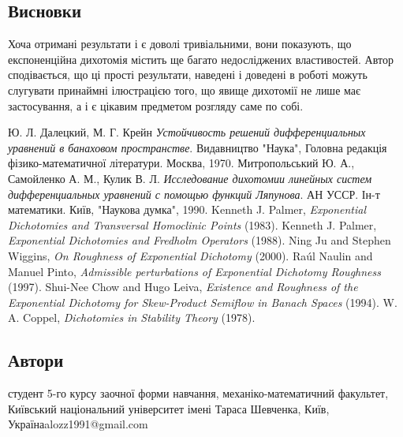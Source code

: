 \documentclass{SHVpaper}
\begin{document}
\subsection{Висновки}
Хоча отримані результати і є доволі тривіальними, вони показують, що експоненційна дихотомія містить ще багато недосліджених 
властивостей. Автор сподівається, що ці прості результати, наведені і доведені в роботі можуть слугувати принаймні ілюстрацією того, що
явище дихотомії не лише має застосування, а і є цікавим предметом розгляду саме по собі.

\begin{thebibliography}{9}
Ю. Л. Далецкий, М. Г. Крейн
\emph{Устойчивость решений дифференциальных уравнений в банаховом пространстве}.
Видавництво "Наука"{}, Головна редакція фізико-математичної літератури. Москва, 1970.
Митропольський Ю. А., Самойленко А. М., Кулик В. Л.
\emph{Исследование дихотомии линейных систем дифференциальных уравнений с помощью функций Ляпунова}.
АН УССР. Ін-т математики. Київ, "Наукова думка", 1990.
	Kenneth J. Palmer, {\em Exponential Dichotomies and Transversal Homoclinic Points} (1983).
	Kenneth J. Palmer, {\em Exponential Dichotomies and Fredholm Operators} (1988).
	Ning Ju and Stephen Wiggins, {\em On Roughness of Exponential Dichotomy} (2000).
	Ra\'ul Naulin and Manuel Pinto, {\em Admissible perturbations of Exponential Dichotomy Roughness} (1997).
	Shui-Nee Chow and Hugo Leiva, {\em Existence and Roughness of the Exponential Dichotomy for Skew-Product Semiflow in Banach Spaces} (1994).
	W. A. Coppel, {\em Dichotomies in Stability Theory} (1978).
\end{thebibliography}

\subsection{Автори}
\author{Олексій Костянтинович Леонтьєв}{студент 5-го курсу заочної форми навчання, механіко-математичний факультет,
Київський національний університет імені Тараса Шевченка, Київ, Україна}{alozz1991@gmail.com}
\end{document}
